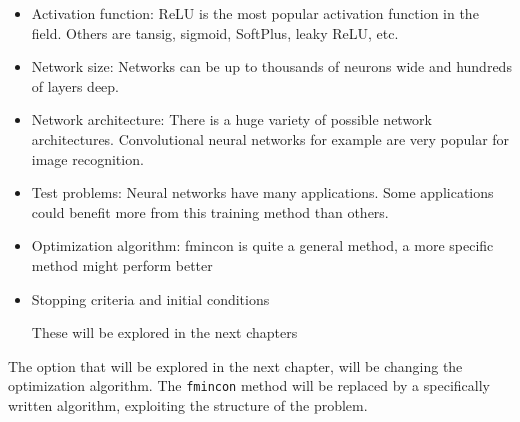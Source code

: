 \begin{itemize}
\item Activation function: ReLU is the most popular activation function in the field. Others are tansig, sigmoid, SoftPlus, leaky ReLU, etc.
\item Network size: Networks can be up to thousands of neurons wide and hundreds of layers deep. 
\item Network architecture: There is a huge variety of possible network architectures. Convolutional neural networks for example are very popular for image recognition.
\item Test problems: Neural networks have many applications. Some applications could benefit more from this training method than others.
\item Optimization algorithm: fmincon is quite a general method, a more specific method might perform better
\item Stopping criteria and initial conditions

These will be explored in the next chapters

\end{itemize}

The option that will be explored in the next chapter, will be changing the optimization algorithm. The \texttt{fmincon} method will be replaced by a specifically written algorithm, exploiting the structure of the problem.





